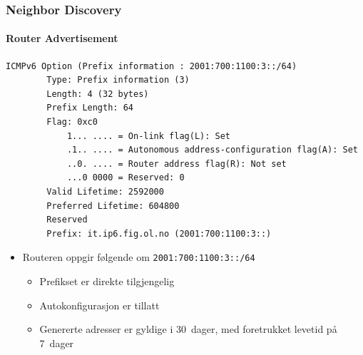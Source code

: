 \begin{frame}[fragile]%
  \frametitle{Neighbor Discovery}
  \framesubtitle{Router Advertisement}
  \begin{multicols}{2}
\begin{Verbatim}[fontsize=\tiny]
    ICMPv6 Option (Prefix information : 2001:700:1100:3::/64)
        Type: Prefix information (3)
        Length: 4 (32 bytes)
        Prefix Length: 64
        Flag: 0xc0
            1... .... = On-link flag(L): Set
            .1.. .... = Autonomous address-configuration flag(A): Set
            ..0. .... = Router address flag(R): Not set
            ...0 0000 = Reserved: 0
        Valid Lifetime: 2592000
        Preferred Lifetime: 604800
        Reserved
        Prefix: it.ip6.fig.ol.no (2001:700:1100:3::)
\end{Verbatim}
  \columnbreak
  \begin{itemize}[<+->]
  \item Routeren oppgir følgende om \texttt{2001:700:1100:3::/64}
    \begin{itemize}[<+->]
    \item Prefikset er direkte tilgjengelig
    \item Autokonfigurasjon er tillatt
    \item Genererte adresser er gyldige i 30~dager, med foretrukket
      levetid på 7~dager
    \end{itemize}
  \end{itemize}
  \end{multicols}
\end{frame}

